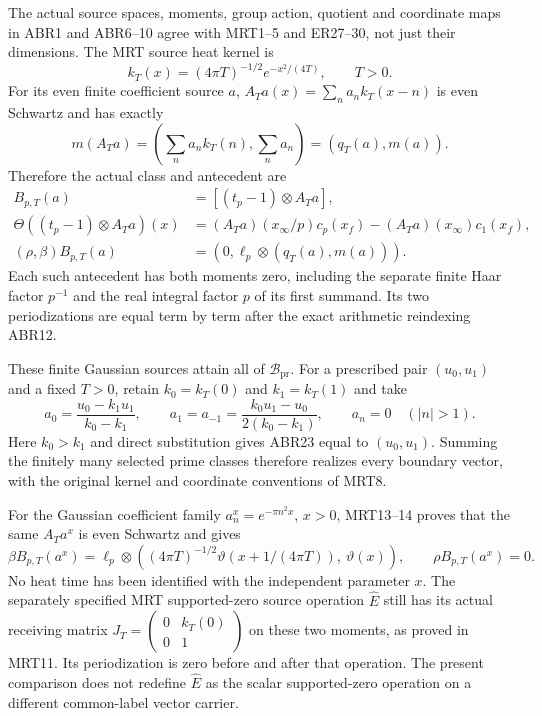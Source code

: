 \documentclass[11pt]{article}
\begin{document}
The actual source spaces, moments, group action, quotient and
coordinate maps in ABR1 and ABR6--10 agree with MRT1--5 and
ER27--30, not just their dimensions. The MRT source heat kernel is
\[
 k_T(x)=(4\pi T)^{-1/2}e^{-x^2/(4T)},\qquad T>0.
\]
For its even finite coefficient source $a$,
$A_Ta(x)=\sum_na_nk_T(x-n)$ is even Schwartz and has exactly
\begin{equation}\tag{ABR23}
 m(A_Ta)=\left(\sum_na_nk_T(n),\sum_na_n\right)
                  =(q_T(a),m(a)).
\end{equation}
Therefore the actual class and antecedent are
\begin{equation}\tag{ABR24}
 \begin{split}
 B_{p,T}(a)&=[(t_p-1)\otimes A_Ta],\\
 \Theta((t_p-1)\otimes A_Ta)(x)
  &=(A_Ta)(x_\infty/p)c_p(x_f)-(A_Ta)(x_\infty)c_1(x_f),\\
 (\rho,\beta)B_{p,T}(a)
  &=\left(0,\ell_p\otimes(q_T(a),m(a))\right).
 \end{split}
\end{equation}
Each such antecedent has both moments zero, including the separate
finite Haar factor $p^{-1}$ and the real integral factor $p$ of
its first summand. Its two periodizations are equal term by term
after the exact arithmetic reindexing ABR12.

These finite Gaussian sources attain all of $\mathcal B_{\mathrm{pr}}$.
For a prescribed pair $(u_0,u_1)$ and a fixed $T>0$, retain
$k_0=k_T(0)$ and $k_1=k_T(1)$ and take
\[
 a_0=\frac{u_0-k_1u_1}{k_0-k_1},\qquad
 a_1=a_{-1}=\frac{k_0u_1-u_0}{2(k_0-k_1)},\qquad
 a_n=0\quad(|n|>1).
\]
Here $k_0>k_1$ and direct substitution gives ABR23 equal to
$(u_0,u_1)$. Summing the finitely many selected prime classes
therefore realizes every boundary vector, with the original
kernel and coordinate conventions of MRT8.

For the Gaussian coefficient family $a_n^x=e^{-\pi n^2x}$,
$x>0$, MRT13--14 proves that the same $A_Ta^x$ is even Schwartz
and gives
\begin{equation}\tag{ABR25}
 \beta B_{p,T}(a^x)
 =\ell_p\otimes\left(
 (4\pi T)^{-1/2}\vartheta(x+1/(4\pi T)),\ \vartheta(x)\right),
 \qquad \rho B_{p,T}(a^x)=0.
\end{equation}
No heat time has been identified with the independent parameter $x$.
The separately specified MRT supported-zero source operation
$\widehat E$ still has its actual receiving matrix
$J_T=\left(\begin{smallmatrix}0&k_T(0)\\0&1\end{smallmatrix}\right)$
on these two moments, as proved in MRT11. Its periodization is
zero before and after that operation. The present comparison does
not redefine $\widehat E$ as the scalar supported-zero operation
on a different common-label vector carrier.
\end{document}
